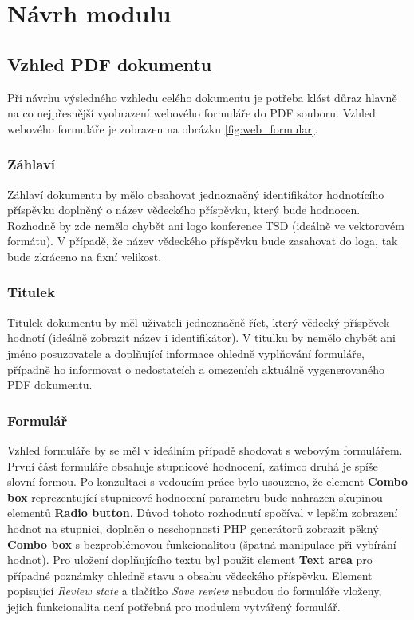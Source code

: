 \chapter{Návrh modulu}

\section{Vzhled PDF dokumentu}
\label{sec:navrh_vzhledu}
Při návrhu výsledného vzhledu celého dokumentu je potřeba klást důraz hlavně na co nejpřesnější vyobrazení webového formuláře do PDF souboru. Vzhled webového formuláře je zobrazen na obrázku \ref{fig:web_formular}.

\subsection{Záhlaví}
Záhlaví dokumentu by mělo obsahovat jednoznačný identifikátor hodnotícího příspěvku doplněný o název vědeckého příspěvku, který bude hodnocen. Rozhodně by zde nemělo chybět ani logo konference TSD (ideálně ve vektorovém formátu). V případě, že název vědeckého příspěvku bude zasahovat do loga, tak bude zkráceno na fixní velikost.

\subsection{Titulek}
Titulek dokumentu by měl uživateli jednoznačně říct, který vědecký příspěvek hodnotí (ideálně zobrazit název i identifikátor). V titulku by nemělo chybět ani jméno posuzovatele a doplňující informace ohledně vyplňování formuláře, případně ho informovat o nedostatcích a omezeních aktuálně vygenerovaného PDF dokumentu.

\subsection{Formulář}
Vzhled formuláře by se měl v ideálním případě shodovat s webovým formulářem. První část formuláře obsahuje stupnicové hodnocení, zatímco druhá je spíše slovní formou. Po konzultaci s vedoucím práce bylo usouzeno, že element \textbf{Combo box} reprezentující stupnicové hodnocení parametru bude nahrazen skupinou elementů \textbf{Radio button}. Důvod tohoto rozhodnutí spočíval v lepším zobrazení hodnot na stupnici, doplněn o neschopnosti PHP generátorů zobrazit pěkný \textbf{Combo box} s bezproblémovou funkcionalitou (špatná manipulace při vybírání hodnot). Pro uložení doplňujícího textu byl použit element \textbf{Text area} pro případné poznámky ohledně stavu a obsahu vědeckého příspěvku. Element popisující \textit{Review state} a tlačítko \textit{Save review} nebudou do formuláře vloženy, jejich funkcionalita není potřebná pro modulem vytvářený formulář.

